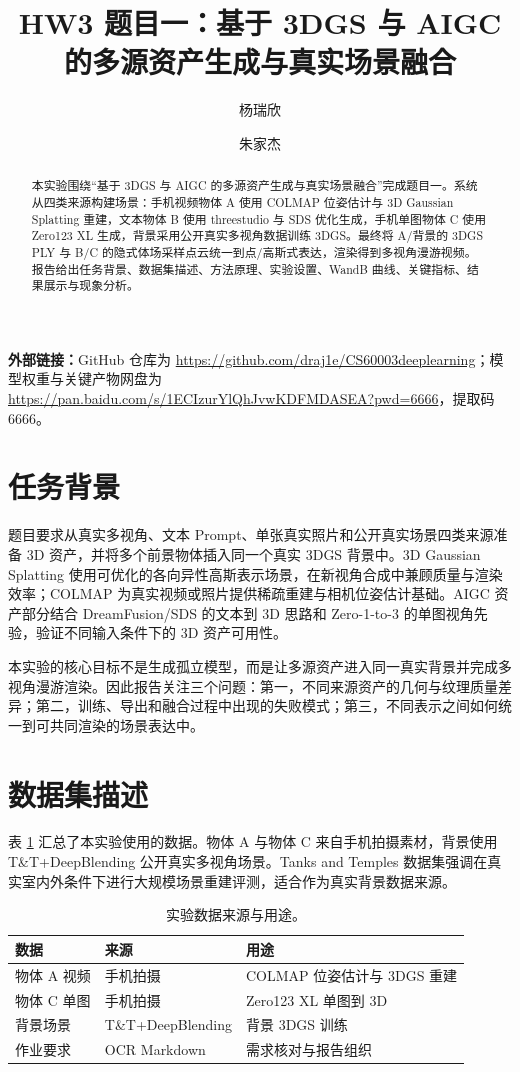\documentclass[10pt,twocolumn]{ctexart}
\title{\vspace{-1.0em}\bfseries HW3 题目一：基于 3DGS 与 AIGC 的多源资产生成与真实场景融合}
\author{
  杨瑞欣\quad 2521098012
  \and
  朱家杰\quad 25210980147
}
\date{}
\newcommand{\repo}{\url{https://github.com/draj1e/CS60003deeplearning}}
\newcommand{\cloud}{\url{https://pan.baidu.com/s/1ECIzurYlQhJvwKDFMDASEA?pwd=6666}}
\begin{document}
\maketitle
\vspace{-1.7em}

\begin{abstract}
本实验围绕“基于 3DGS 与 AIGC 的多源资产生成与真实场景融合”完成题目一。系统从四类来源构建场景：手机视频物体 A 使用 COLMAP 位姿估计与 3D Gaussian Splatting 重建，文本物体 B 使用 threestudio 与 SDS 优化生成，手机单图物体 C 使用 Zero123 XL 生成，背景采用公开真实多视角数据训练 3DGS。最终将 A/背景的 3DGS PLY 与 B/C 的隐式体场采样点云统一到点/高斯式表达，渲染得到多视角漫游视频。报告给出任务背景、数据集描述、方法原理、实验设置、WandB 曲线、关键指标、结果展示与现象分析。
\end{abstract}

\noindent\textbf{外部链接：}GitHub 仓库为 \repo；模型权重与关键产物网盘为 \cloud，提取码 6666。

\section{任务背景}
题目要求从真实多视角、文本 Prompt、单张真实照片和公开真实场景四类来源准备 3D 资产，并将多个前景物体插入同一个真实 3DGS 背景中。3D Gaussian Splatting 使用可优化的各向异性高斯表示场景，在新视角合成中兼顾质量与渲染效率\cite{kerbl2023gaussian}；COLMAP 为真实视频或照片提供稀疏重建与相机位姿估计基础\cite{schoenberger2016sfm}。AIGC 资产部分结合 DreamFusion/SDS 的文本到 3D 思路\cite{poole2022dreamfusion}和 Zero-1-to-3 的单图视角先验\cite{liu2023zero123}，验证不同输入条件下的 3D 资产可用性。

本实验的核心目标不是生成孤立模型，而是让多源资产进入同一真实背景并完成多视角漫游渲染。因此报告关注三个问题：第一，不同来源资产的几何与纹理质量差异；第二，训练、导出和融合过程中出现的失败模式；第三，不同表示之间如何统一到可共同渲染的场景表达中。

\section{数据集描述}
表 \ref{tab:data} 汇总了本实验使用的数据。物体 A 与物体 C 来自手机拍摄素材，背景使用 T\&T+DeepBlending 公开真实多视角场景。Tanks and Temples 数据集强调在真实室内外条件下进行大规模场景重建评测，适合作为真实背景数据来源\cite{knapitsch2017tanks}。

\begin{table}[H]
  \centering
  \caption{实验数据来源与用途。}
  \label{tab:data}
  \small
  \begin{tabularx}{\columnwidth}{@{}l l X@{}}
    \toprule
    数据 & 来源 & 用途 \\
    \midrule
    物体 A 视频 & 手机拍摄 & COLMAP 位姿估计与 3DGS 重建 \\
    物体 C 单图 & 手机拍摄 & Zero123 XL 单图到 3D \\
    背景场景 & T\&T+DeepBlending & 背景 3DGS 训练 \\
    作业要求 & OCR Markdown & 需求核对与报告组织 \\
    \bottomrule
  \end{tabularx}
\end{table}
\end{document}
